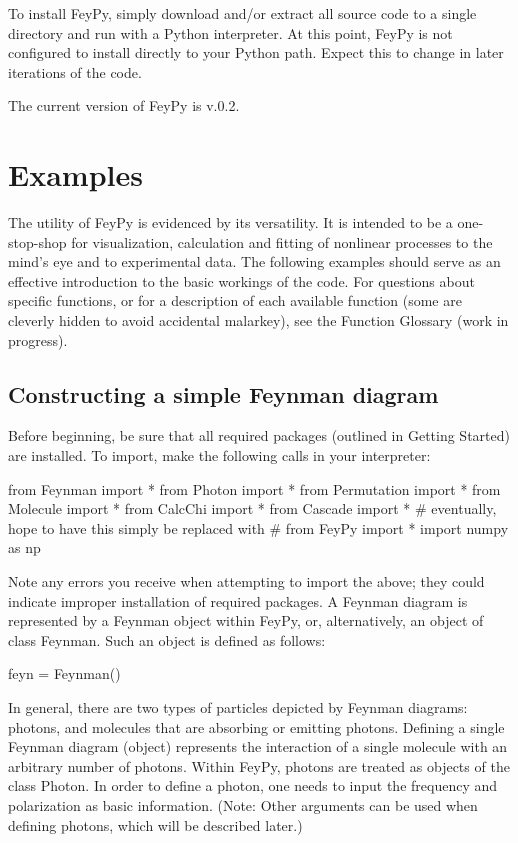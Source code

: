 \documentclass[11pt,a4paper,notitlepage]{article}
\begin{document}
To install FeyPy, simply download and/or extract all source code to a single directory and run with a Python interpreter. At this point, FeyPy is not configured to install directly to your Python path. Expect this to change in later iterations of the code.

The current version of FeyPy is v.0.2.

\section{Examples}

The utility of FeyPy is evidenced by its versatility. It is intended to be a one-stop-shop for visualization, calculation and fitting of nonlinear processes to the mind's eye and to experimental data. The following examples should serve as an effective introduction to the basic workings of the code. For questions about specific functions, or for a description of each available function (some are cleverly hidden to avoid accidental malarkey), see the Function Glossary (work in progress).

\subsection{Constructing a simple Feynman diagram}

Before beginning, be sure that all required packages (outlined in Getting Started) are installed. To import, make the following calls in your interpreter:

\begin{code}
from Feynman import *
from Photon import *
from Permutation import *
from Molecule import *
from CalcChi import *
from Cascade import *
# eventually, hope to have this simply be replaced with
# from FeyPy import *
import numpy as np
\end{code} 

Note any errors you receive when attempting to import the above; they could indicate improper installation of required packages. A Feynman diagram is represented by a Feynman object within FeyPy, or, alternatively, an object of class Feynman. Such an object is defined as follows:

\begin{code}
feyn = Feynman()
\end{code}

In general, there are two types of particles depicted by Feynman diagrams: photons, and molecules that are absorbing or emitting photons. Defining a single Feynman diagram (object) represents the interaction of a single molecule with an arbitrary number of photons. Within FeyPy, photons are treated as objects of the class Photon. In order to define a photon, one needs to input the frequency and polarization as basic information. (Note: Other arguments can be used when defining photons, which will be described later.)
\end{document}
